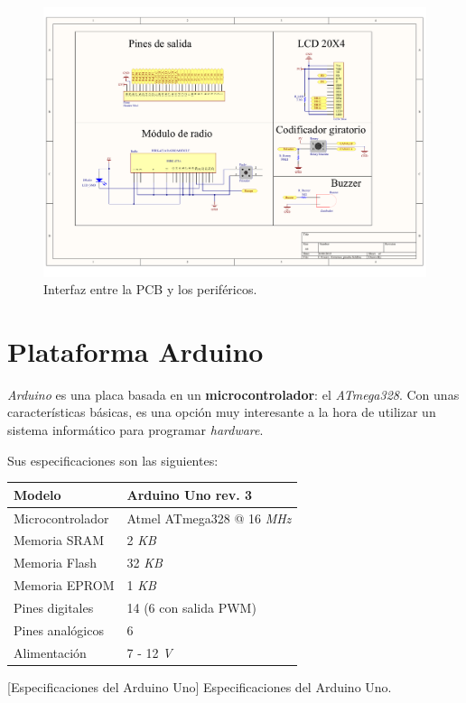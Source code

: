 \begin{figure}[H]
	\noindent \begin{centering}
		\includegraphics[width=\linewidth]{capitulo3/pcb_perifericos}
		\par\end{centering}
	\smallskip
	\caption{\label{fig:pcb_perifericos} Interfaz entre la PCB y los periféricos.}
\end{figure} 

\smallskip

\newpage

\section{Plataforma Arduino}

\textit{Arduino} es una placa basada en un \textbf{microcontrolador}: el \textit{ATmega328}. Con unas características básicas, es una opción muy interesante a la hora de utilizar un sistema informático para programar \textit{hardware}.

Sus especificaciones son las siguientes:

\smallskip

\begin{center}
	\begin{tabular}{|l|l|}
		\hline Modelo & Arduino Uno rev. 3 \\
		\hline Microcontrolador & Atmel ATmega328 @ 16 \textit{MHz}\\
		\hline Memoria SRAM & 2 \textit{KB} \\		
		\hline Memoria Flash & 32 \textit{KB} \\
		\hline Memoria EPROM & 1 \textit{KB} \\
		\hline Pines digitales & 14 (6 con salida \acrshort{PWM}) \\
		\hline Pines analógicos & 6 \\
		\hline Alimentación & 7 - 12 \textit{V} \\
		\hline 
	\end{tabular}
	\smallskip
	[Especificaciones del Arduino Uno]{\label{tab:rapberry} Especificaciones del Arduino Uno. \cite{arduino}}
	
\end{center}


